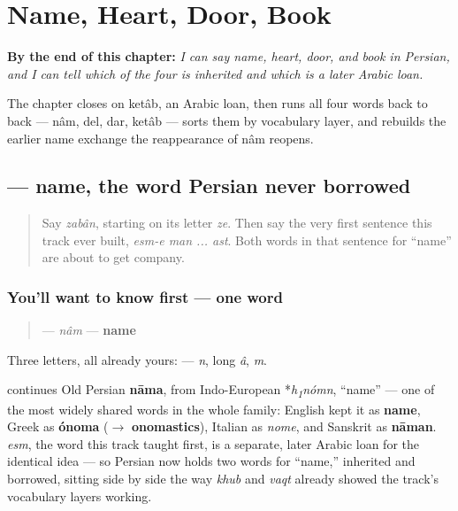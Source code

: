
\chapter{Name, Heart, Door, Book}
\label{ch:fa-name-heart-door-book}

\begin{chapteropening}
\textbf{By the end of this chapter:} \emph{I can say name, heart, door, and book in Persian, and I can tell which of the four is inherited and which is a later Arabic loan.}

The chapter closes on ketâb, an Arabic loan, then runs all four words back to back — nâm, del, dar, ketâb — sorts them by vocabulary layer, and rebuilds the earlier name exchange the reappearance of nâm reopens.
\end{chapteropening}

\section[\texorpdfstring{\fa{نام} (nâm)}{نام (nâm)}]{ — name, the word Persian never borrowed}

\label{lesson:FA-C12-nam}



\begin{quote}
Say \emph{zabân}, starting on its letter \emph{ze}. Then say the very first sentence this track ever built, \emph{esm-e man ... ast}. Both words in that sentence for \textquotedblleft{}name\textquotedblright{} are about to get company.
\end{quote}

\subsection*{You'll want to know first — one word}
\begin{quote}
\textbf{} — \emph{nâm} — \textbf{name}
\end{quote}

Three letters, all already yours: \textbf{  } — \emph{n}, long \emph{â}, \emph{m}.

\begin{cousinweb}
\textbf{} continues Old Persian \textbf{nāma}, from Indo-European *\emph{h\textsubscript{1}nómn}, \textquotedblleft{}name\textquotedblright{} — one of the most widely shared words in the whole family: English kept it as \textbf{name}, Greek as \textbf{ónoma} ($\to$ \textbf{onomastics}), Italian as \emph{nome}, and Sanskrit as \textbf{nāman}. \textbf{} \emph{esm}, the word this track taught first, is a separate, later Arabic loan for the identical idea — so Persian now holds two words for \textquotedblleft{}name,\textquotedblright{} inherited and borrowed, sitting side by side the way \emph{khub} and \emph{vaqt} already showed the track's vocabulary layers working.
\end{cousinweb}

